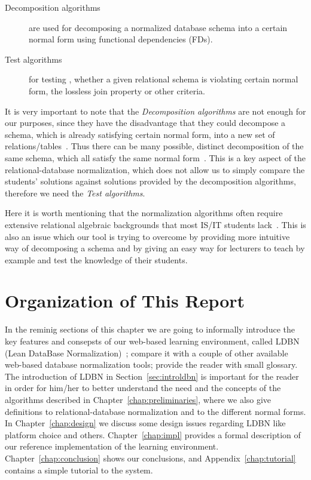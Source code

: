 \begin{description}
	\item[Decomposition algorithms] are used for decomposing a normalized database 
	schema into a certain normal form using functional dependencies (FDs).
	\item[Test algorithms] for testing , whether a given relational schema is 
	violating certain normal form, the lossless join property or other criteria.
\end{description}

It is very important to note that the \textit{Decomposition algorithms} are not enough for
our purposes, since they have the 
disadvantage that they could decompose a schema, which is already satisfying 
certain normal form, into a new set of relations/tables~\cite{p4}. Thus there can be many 
possible, distinct decomposition of the same schema, which all satisfy the same 
normal form~\cite{bdb4}. This is a key aspect of the relational-database normalization,
which does not allow us to simply compare the
students' solutions against solutions provided by the decomposition algorithms,
therefore we need the \textit{Test algorithms}.

Here it is worth mentioning that the normalization algorithms often require 
extensive relational algebraic backgrounds that most IS/IT students lack~\cite{p8}. This
is also an issue which our tool is trying to overcome by providing more intuitive 
way of decomposing a schema and by giving an easy way for lecturers to
teach by example and test the knowledge of their students. 

\section{Organization of This Report}
\label{sec:organization}
In the reminig sections of this chapter we are going to informally introduce 
the key features and consepsts of our web-based learning environment, 
called LDBN (Lean DataBase Normalization)~\cite{wldbn}; 
compare it with a couple of other 
available web-based database normalization tools; provide the reader with small glossary.  
The introduction of LDBN in Section~\ref{sec:introldbn} is important for the reader
in order for him/her to better understand the need and the concepts of the algorithms described in 
Chapter~\ref{chap:preliminaries}, where we also give definitions to
relational-database normalization and to the different normal forms. 
In Chapter~\ref{chap:design} we discuss some design issues regarding LDBN like 
platform choice and others. Chapter~\ref{chap:impl} provides a formal description
of our reference implementation of the learning environment. 
Chapter~\ref{chap:conclusion} shows our conclusions, and 
Appendix~\ref{chap:tutorial} contains a simple tutorial to the system.

